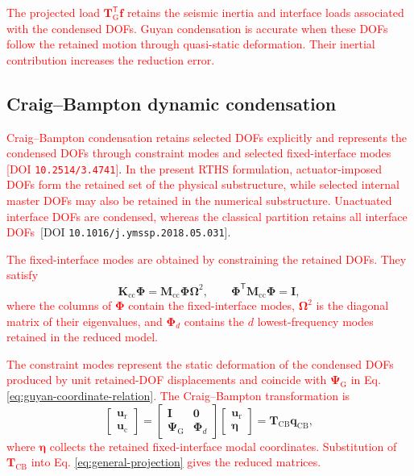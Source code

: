 \documentclass[11pt,a4paper]{article}
\numberwithin{equation}{section}
\newcommand{\rev}[1]{\textcolor{red}{#1}}
\begin{document}
\rev{The projected load \(\mathbf{T}_{\mathrm{G}}^{\mathsf{T}}\bm{f}\) retains the seismic inertia and interface loads associated with the condensed DOFs. Guyan condensation is accurate when these DOFs follow the retained motion through quasi-static deformation. Their inertial contribution increases the reduction error.}

\subsection{Craig--Bampton dynamic condensation}
\label{sec:cb-condensation}

\rev{Craig--Bampton condensation retains selected DOFs explicitly and represents the condensed DOFs through constraint modes and selected fixed-interface modes} \cite{CraigBampton1968}\,\rev{[DOI \nolinkurl{10.2514/3.4741}]}. \rev{In the present RTHS formulation, actuator-imposed DOFs form the retained set of the physical substructure, while selected internal master DOFs may also be retained in the numerical substructure. Unactuated interface DOFs are condensed, whereas the classical partition retains all interface DOFs} \cite{Krattiger2019}\,[DOI \nolinkurl{10.1016/j.ymssp.2018.05.031}].

\rev{The fixed-interface modes are obtained by constraining the retained DOFs. They satisfy}
\begin{equation}
	\mathbf{K}_{\mathrm{cc}}\bm{\Phi}
	=\mathbf{M}_{\mathrm{cc}}\bm{\Phi}\bm{\Omega}^{2},
	\qquad
	\bm{\Phi}^{\mathsf{T}}\mathbf{M}_{\mathrm{cc}}\bm{\Phi}=\mathbf{I},
	\label{eq:fixed-interface-modes}
\end{equation}
\rev{where the columns of \(\bm{\Phi}\) contain the fixed-interface modes, \(\bm{\Omega}^{2}\) is the diagonal matrix of their eigenvalues, and \(\bm{\Phi}_{d}\) contains the \(d\) lowest-frequency modes retained in the reduced model.}

\rev{The constraint modes represent the static deformation of the condensed DOFs produced by unit retained-DOF displacements and coincide with \(\bm{\Psi}_{\mathrm{G}}\) in Eq. \eqref{eq:guyan-coordinate-relation}. The Craig--Bampton transformation is}
\begin{equation}
	\begin{bmatrix}
		\bm{u}_{\mathrm{r}}\\
		\bm{u}_{\mathrm{c}}
	\end{bmatrix}
	=
	\begin{bmatrix}
		\mathbf{I} & \mathbf{0}\\
		\bm{\Psi}_{\mathrm{G}} & \bm{\Phi}_{d}
	\end{bmatrix}
	\begin{bmatrix}
		\bm{u}_{\mathrm{r}}\\
		\bm{\eta}
	\end{bmatrix}
	=
	\mathbf{T}_{\mathrm{CB}}\bm{q}_{\mathrm{CB}},
	\label{eq:cb-transformation}
\end{equation}
\rev{where \(\bm{\eta}\) collects the retained fixed-interface modal coordinates. Substitution of \(\mathbf{T}_{\mathrm{CB}}\) into Eq. \eqref{eq:general-projection} gives the reduced matrices.}
\end{document}
